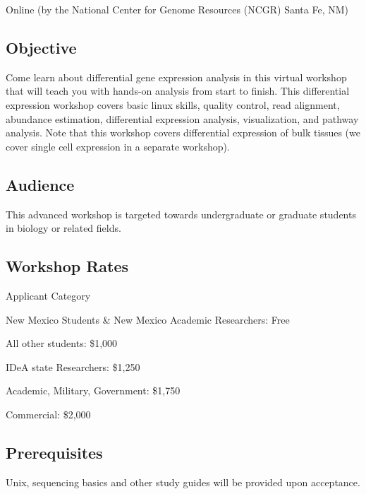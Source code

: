 \documentclass[
]{book}
\begin{document}
Online (by the National Center for Genome Resources (NCGR) Santa Fe, NM)

\hypertarget{objective}{%
\subsection*{Objective}\label{objective}}

Come learn about differential gene expression analysis in this virtual workshop that will teach you with hands-on analysis from start to finish. This differential expression workshop covers basic linux skills, quality control, read alignment, abundance estimation, differential expression analysis, visualization, and pathway analysis. Note that this workshop covers differential expression of bulk tissues (we cover single cell expression in a separate workshop).

\hypertarget{audience}{%
\subsection*{Audience}\label{audience}}

This advanced workshop is targeted towards undergraduate or graduate students in biology or related fields.

\hypertarget{workshop-rates}{%
\subsection*{Workshop Rates}\label{workshop-rates}}

Applicant Category

New Mexico Students \& New Mexico Academic Researchers:
Free

All other students:
\$1,000

IDeA state Researchers:
\$1,250

Academic, Military, Government:
\$1,750

Commercial:
\$2,000

\hypertarget{prerequisites}{%
\subsection*{Prerequisites}\label{prerequisites}}

Unix, sequencing basics and other study guides will be provided upon acceptance.
\end{document}
